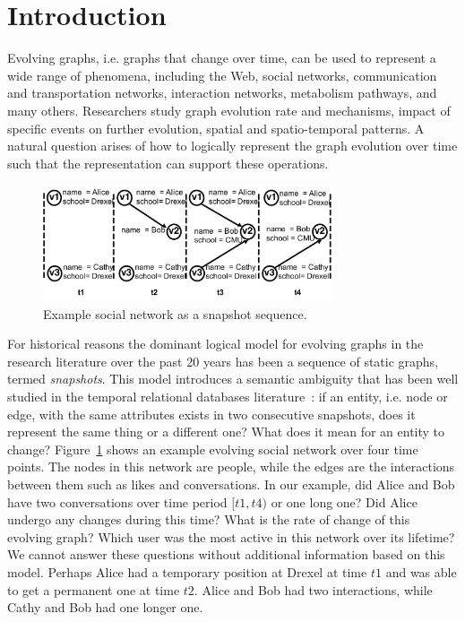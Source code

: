 \section{Introduction}
\label{sec:intro}

Evolving graphs, i.e. graphs that change over time, can be used to
represent a wide range of phenomena, including the Web, social
networks, communication and transportation networks, interaction
networks, metabolism pathways, and many others.  Researchers study
graph evolution rate and mechanisms, impact of specific events on
further evolution, spatial and spatio-temporal patterns.  A natural
question arises of how to logically represent the graph evolution over
time such that the representation can support these operations.

\begin{figure}[b]
\includegraphics[width=3.4in]{figs/T1_graphs.pdf}
\vspace{-0.5cm}
\caption{Example social network as a snapshot sequence.}
\label{fig:snapshots}
\end{figure}

For historical reasons the dominant logical model for evolving graphs
in the research literature over the past 20 years has been a sequence
of static graphs, termed {\em snapshots}.  This model introduces a
semantic ambiguity that has been well studied in the temporal
relational databases literature~\cite{Bohlen1998}: if an entity,
i.e. node or edge, with the same attributes exists in two consecutive
snapshots, does it represent the same thing or a different one?  What
does it mean for an entity to change?  Figure~\ref{fig:snapshots}
shows an example evolving social network over four time points.  The
nodes in this network are people, while the edges are the interactions
between them such as likes and conversations.  In our example, did
Alice and Bob have two conversations over time period $[t1, t4)$ or
  one long one?  Did Alice undergo any changes during this time?  What
  is the rate of change of this evolving graph?  Which user was the
  most active in this network over its lifetime?  We cannot answer
  these questions without additional information based on this model.
  Perhaps Alice had a temporary position at Drexel at time $t1$ and
  was able to get a permanent one at time $t2$.  Alice and Bob had two
  interactions, while Cathy and Bob had one longer one.

